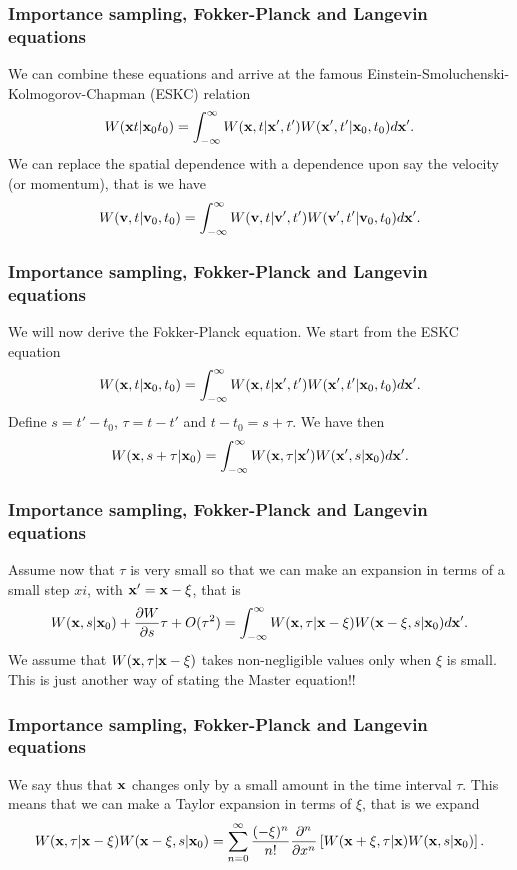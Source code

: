 \documentclass{beamer}
\begin{document}
\begin{frame}
\frametitle{Importance sampling, Fokker-Planck and Langevin equations}

\begin{block}{}
We can combine these equations and arrive at the famous Einstein-Smoluchenski-Kolmogorov-Chapman (ESKC) relation
\[
 W({\bf x}t|{\bf x}_0t_0)  = \int_{-\infty}^{\infty} W({\bf x},t|{\bf x}',t')W({\bf x}',t'|{\bf x}_0,t_0)d{\bf x}'.
\]
We can replace the spatial dependence with a dependence upon say the velocity
(or momentum), that is we have
\[
 W({\bf v},t|{\bf v}_0,t_0)  = \int_{-\infty}^{\infty} W({\bf v},t|{\bf v}',t')W({\bf v}',t'|{\bf v}_0,t_0)d{\bf x}'.
\]


\end{block}
\end{frame}

\begin{frame}
\frametitle{Importance sampling, Fokker-Planck and Langevin equations}

\begin{block}{}
We will now derive the Fokker-Planck equation. 
We start from the ESKC equation
\[
 W({\bf x},t|{\bf x}_0,t_0)  = \int_{-\infty}^{\infty} W({\bf x},t|{\bf x}',t')W({\bf x}',t'|{\bf x}_0,t_0)d{\bf x}'.
\]
Define $s=t'-t_0$, $\tau=t-t'$ and $t-t_0=s+\tau$. We have then
\[
 W({\bf x},s+\tau|{\bf x}_0)  = \int_{-\infty}^{\infty} W({\bf x},\tau|{\bf x}')W({\bf x}',s|{\bf x}_0)d{\bf x}'.
\]
\end{block}
\end{frame}

\begin{frame}
\frametitle{Importance sampling, Fokker-Planck and Langevin equations}

\begin{block}{}
Assume now that $\tau$ is very small so that we can make an expansion in terms of a small step $xi$, with ${\bf x}'={\bf x}-\xi$, that is
\[
 W({\bf x},s|{\bf x}_0)+\frac{\partial W}{\partial s}\tau +O(\tau^2) = \int_{-\infty}^{\infty} W({\bf x},\tau|{\bf x}-\xi)W({\bf x}-\xi,s|{\bf x}_0)d{\bf x}'.
\]
We assume that $W({\bf x},\tau|{\bf x}-\xi)$ takes non-negligible values only when $\xi$ is small. This is just another way of stating the Master equation!!
\end{block}
\end{frame}

\begin{frame}
\frametitle{Importance sampling, Fokker-Planck and Langevin equations}

\begin{block}{}
We say thus that ${\bf x}$ changes only by a small amount in the time interval $\tau$. 
This means that we can make a Taylor expansion in terms of $\xi$, that is we
expand
\[
W({\bf x},\tau|{\bf x}-\xi)W({\bf x}-\xi,s|{\bf x}_0) =
\sum_{n=0}^{\infty}\frac{(-\xi)^n}{n!}\frac{\partial^n}{\partial x^n}\left[W({\bf x}+\xi,\tau|{\bf x})W({\bf x},s|{\bf x}_0)
\right].
\]
\end{block}
\end{frame}
\end{document}
